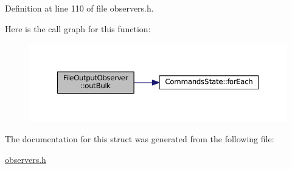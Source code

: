 Definition at line 110 of file observers.\+h.



Here is the call graph for this function\+:
\nopagebreak
\begin{figure}[H]
\begin{center}
\leavevmode
\includegraphics[width=350pt]{struct_file_output_observer_a818d1d56e2495ecfa79a50297a0639ce_cgraph}
\end{center}
\end{figure}




The documentation for this struct was generated from the following file\+:\begin{DoxyCompactItemize}
\item 
\hyperlink{observers_8h}{observers.\+h}\end{DoxyCompactItemize}
